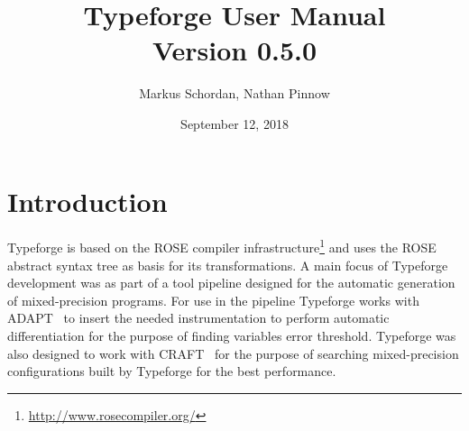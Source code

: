 \documentclass[natbib]{article}
\begin{document}
\title{Typeforge User Manual\\Version 0.5.0}

\author{\small Markus Schordan, Nathan Pinnow}
\date{September 12, 2018}

\maketitle

%

\tableofcontents


\section{Introduction}
\label{sec:intro}

Typeforge is based on the ROSE compiler infrastructure\footnote{\url{http://www.rosecompiler.org/}} 
and uses the ROSE abstract syntax tree as basis for its transformations. 
A main focus of Typeforge development was as part of a tool pipeline designed for 
the automatic generation of mixed-precision programs. For use in the pipeline 
Typeforge works with ADAPT~\cite{adapt} to insert the needed instrumentation to 
perform automatic differentiation for the purpose of finding variables error threshold.
Typeforge was also designed to work with CRAFT~\cite{CRAFT2013PARCO,CRAFT2013ICS,CRAFT2016} 
for the purpose of searching mixed-precision configurations built by Typeforge 
for the best performance.
\end{document}
